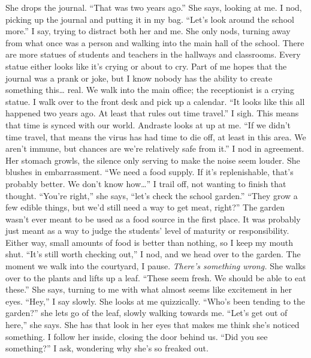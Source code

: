 \documentclass[a4paper, 12pt]{book}
\newcommand\tab[1][1cm]{\hspace*{#1}}
\begin{document}
\tab
She drops the journal. “That was two years ago.” She says, looking at me.
\newline
\tab
I nod, picking up the journal and putting it in my bag. “Let’s look around the school more.” I say, trying to distract both her and me. She only nods, turning away from what once was a person and walking into the main hall of the school. There are more statues of students and teachers in the hallways and classrooms. Every statue either looks like it’s crying or about to cry. Part of me hopes that the journal was a prank or joke, but I know nobody has the ability to create something this… real. We walk into the main office; the receptionist is a crying statue. I walk over to the front desk and pick up a calendar. “It looks like this all happened two years ago. At least that rules out time travel.” I sigh. This means that time is synced with our world.
\newline
\tab
Andraste looks at up at me. “If we didn’t time travel, that means the virus has had time to die off, at least in this area. We aren’t immune, but chances are we’re relatively safe from it.” I nod in agreement. Her stomach growls, the silence only serving to make the noise seem louder. She blushes in embarrassment.
\newline
\tab
“We need a food supply. If it’s replenishable, that’s probably better. We don’t know how…” I trail off, not wanting to finish that thought.
\newline
\tab
“You’re right,” she says, “let’s check the school garden.”
\newline
\tab
“They grow a few edible things, but we’d still need a way to get meat, right?” The garden wasn’t ever meant to be used as a food source in the first place. It was probably just meant as a way to judge the students’ level of maturity or responsibility. Either way, small amounts of food is better than nothing, so I keep my mouth shut.
\newline
\tab
“It’s still worth checking out,” I nod, and we head over to the garden. The moment we walk into the courtyard, I pause. \textit{There’s something wrong.} She walks over to the plants and lifts up a leaf. “These seem fresh. We should be able to eat these.” She says, turning to me with what almost seems like excitement in her eyes.
\newline
\tab
“Hey,” I say slowly. She looks at me quizzically. “Who’s been tending to the garden?” she lets go of the leaf, slowly walking towards me. “Let’s get out of here,” she says. She has that look in her eyes that makes me think she’s noticed something. I follow her inside, closing the door behind us. “Did you see something?” I ask, wondering why she’s so freaked out.
\end{document}
